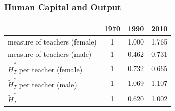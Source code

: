 \documentclass[11pt]{beamer}
\begin{document}
\begin{frame}
\frametitle{Human Capital and Output}

\begin{table}
  \centering \begin{tabular}{lccc}
\toprule
& 1970 & 1990 & 2010 \\
\midrule
measure of teachers (female) & 1 & 1.000 & 1.765\\
measure of teachers (male) & 1 & 0.462 & 0.731\\
$\widetilde{H}_T^*$ per teacher (female)   & 1 & 0.732 & 0.665 \\
$\widetilde{H}_T^*$ per teacher (male)   & 1 & 1.069 & 1.107 \\
$\widetilde{H}_T^*$ & 1  & 0.620 & 1.002 \\
\bottomrule
\end{tabular}
  \label{ }
\end{table}
%


\end{frame}
\end{document}
